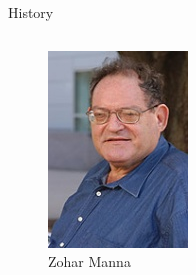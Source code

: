 \begin{frame}{History}
\begin{columns}[c]
\begin{column}{.3\textwidth}
            \begin{figure}
                \includegraphics[scale=0.5]{images/manna.jpg}
                \caption{Zohar Manna}
            \end{figure}
        \end{column}
        
    \end{columns}
    
\end{frame}


